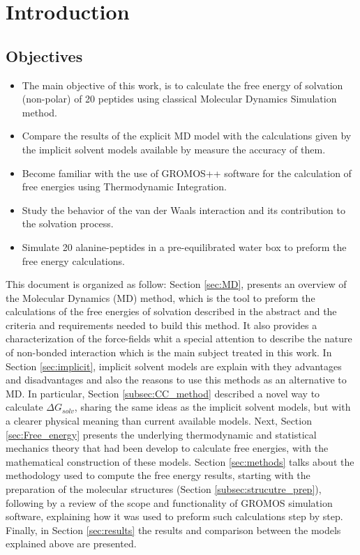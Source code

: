\setcounter{section}{0}
\section{Introduction}\label{sec:intro}


\vspace{3cm}
\par






\subsection{Objectives}
\begin{itemize}
    \item The main objective of this work, is to calculate the free energy of solvation (non-polar) of 20 peptides using classical Molecular Dynamics Simulation method.
    \item Compare the results of the explicit MD model with the calculations given by the implicit solvent models available by measure the accuracy of them.
    \item  Become familiar with the use of GROMOS++ software for the calculation of free energies using Thermodynamic Integration. 
    \item Study the behavior of the van der Waals interaction and its contribution to the solvation process. 
    \item Simulate 20 alanine-peptides in a pre-equilibrated water box to preform the free energy calculations. 
\end{itemize}

This document is organized as follow: Section \ref{sec:MD}, presents an overview of the Molecular Dynamics (MD) method, which is the tool to preform the calculations of the free energies of solvation described in the abstract and the criteria and requirements needed to build this method. It also provides a characterization of the force-fields whit a special attention to describe the nature of non-bonded interaction which is the main subject treated in this work.
In Section \ref{sec:implicit}, implicit solvent models are explain with they advantages and disadvantages and also the reasons to use this methods as an alternative to MD. In particular, Section \ref{subsec:CC_method} described a novel way to calculate $\Delta G_{solv}$, sharing the same ideas as the implicit solvent models, but with a clearer physical meaning than current available models. 
Next, Section \ref{sec:Free_energy} presents the underlying thermodynamic and statistical mechanics theory that had been develop to calculate free energies, with the mathematical construction of these models. Section \ref{sec:methods} talks about the methodology used to compute the free energy results, starting with the preparation of the molecular structures (Section \ref{subsec:strucutre_prep}), following by a review of the scope and functionality of GROMOS simulation software, explaining how it was used to preform such calculations step by step. 
Finally, in Section \ref{sec:results} the results and comparison between the models explained above are presented.

